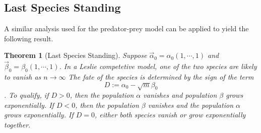 \documentclass{article}
\newtheorem{theorem}{Theorem}[section]
\newtheorem{theorem}{Theorem}
\numberwithin{equation}{section}
\begin{document}
\subsection{Last Species Standing}

A similar analysis used for the predator-prey model 
can be applied to yield the following result. 

\begin{theorem}[Last Species Standing]
    Suppose $\vec \alpha_0 = \alpha_0 (1, \cdots, 1)$ and 
    $\vec \beta_0 = \beta_0 (1, \cdots, 1)$.
    In a Leslie competetive model, one of the two 
    species are likely to vanish as $n \rightarrow \infty$  
    The fate of the species is determined 
    by the sign of the term 
    \[
        D := \alpha_0 - \sqrt{m} \beta_0
    \]
    . To qualify, if $D > 0$, then the population $\alpha$ 
    vanishes and population $\beta$ grows exponentially.
     If $D < 0$, then the population $\beta$ vanishes and the population $\alpha$ 
     grows exponentially. 
    If $D = 0$, either both species vanish or grow exponentially together. 
\end{theorem}
\end{document}
